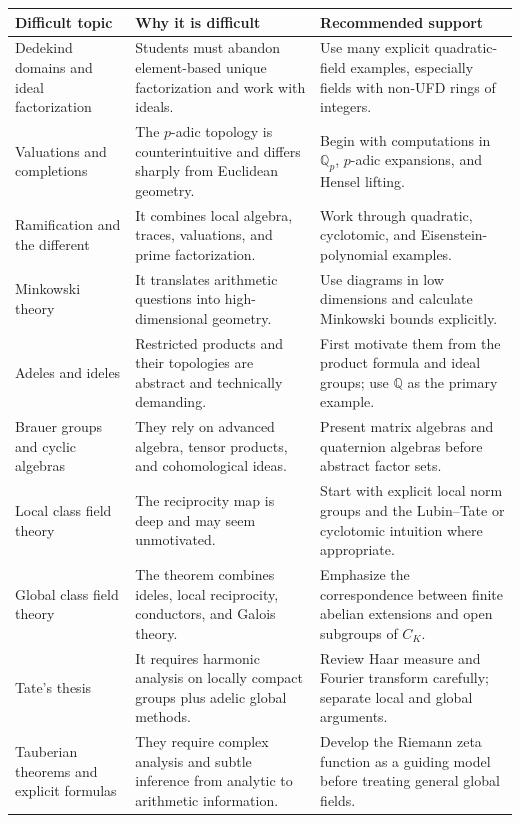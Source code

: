 \documentclass[11pt]{article}
\newcommand{\Q}{\mathbb{Q}}
\begin{document}
\begin{longtable}{p{}p{}p{}}
\toprule
\textbf{Difficult topic} & \textbf{Why it is difficult} & \textbf{Recommended support} \\
\midrule
\endhead

Dedekind domains and ideal factorization &
Students must abandon element-based unique factorization and work with ideals. &
Use many explicit quadratic-field examples, especially fields with non-UFD rings of integers. \\

Valuations and completions &
The $p$-adic topology is counterintuitive and differs sharply from Euclidean geometry. &
Begin with computations in $\Q_p$, $p$-adic expansions, and Hensel lifting. \\

Ramification and the different &
It combines local algebra, traces, valuations, and prime factorization. &
Work through quadratic, cyclotomic, and Eisenstein-polynomial examples. \\

Minkowski theory &
It translates arithmetic questions into high-dimensional geometry. &
Use diagrams in low dimensions and calculate Minkowski bounds explicitly. \\

Adeles and ideles &
Restricted products and their topologies are abstract and technically demanding. &
First motivate them from the product formula and ideal groups; use $\Q$ as the primary example. \\

Brauer groups and cyclic algebras &
They rely on advanced algebra, tensor products, and cohomological ideas. &
Present matrix algebras and quaternion algebras before abstract factor sets. \\

Local class field theory &
The reciprocity map is deep and may seem unmotivated. &
Start with explicit local norm groups and the Lubin--Tate or cyclotomic intuition where appropriate. \\

Global class field theory &
The theorem combines ideles, local reciprocity, conductors, and Galois theory. &
Emphasize the correspondence between finite abelian extensions and open subgroups of $C_K$. \\

Tate's thesis &
It requires harmonic analysis on locally compact groups plus adelic global methods. &
Review Haar measure and Fourier transform carefully; separate local and global arguments. \\

Tauberian theorems and explicit formulas &
They require complex analysis and subtle inference from analytic to arithmetic information. &
Develop the Riemann zeta function as a guiding model before treating general global fields. \\
\bottomrule
\end{longtable}
\end{document}
